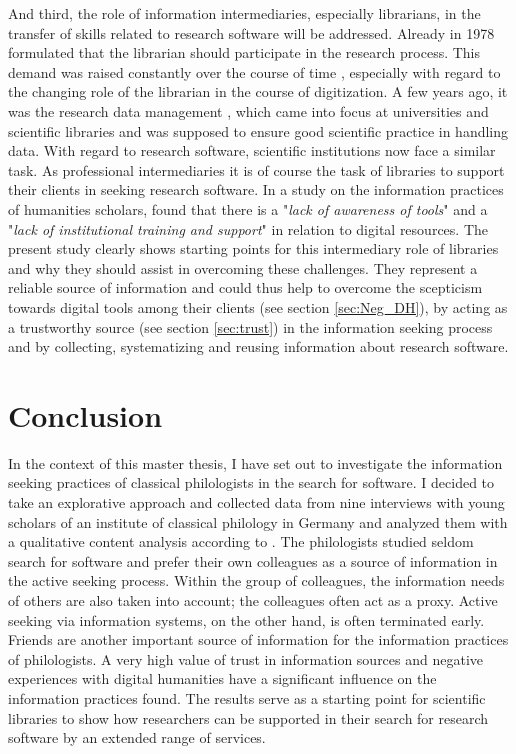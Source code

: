 \documentclass[12pt, a4paper, titlepage, oneside, abstract=true, toc=listof, toc=bibliography, BCOR=1cm]{scrreprt}
\begin{document}
{%
And third, the role of information intermediaries, especially librarians, in the transfer of skills related to research software will be addressed. Already in 1978 \citet{Gunning1978} formulated that the librarian should participate in the research process. This demand was raised constantly over the course of time \citep{Buddenbohm2017, Case2008, Cunningham2010, Koltay2016, MonroeGulick2013, Rothfritz2018, Warwick2008}, especially with regard to the changing role of the librarian in the course of digitization. A few years ago, it was the research data management \citep{Coates2014}, which came into focus at universities and scientific libraries and was supposed to ensure good scientific practice in handling data. With regard to research software, scientific institutions now face a similar task. As professional intermediaries \citep{Edmond2005} it is of course the task of libraries to support their clients in seeking research software. In a study on the information practices of humanities scholars, \citet[p. 73]{Bulger2011} found that there is a "\textit{lack of awareness of tools}" and a "\textit{lack of institutional training and support}" in relation to digital resources. The present study clearly shows starting points for this intermediary role of libraries and why they should assist in overcoming these challenges. They represent a reliable source of information and could thus help to overcome the scepticism towards digital tools among their clients (see section \ref{sec:Neg_DH}), by acting as a trustworthy source (see section \ref{sec:trust}) in the information seeking process and by collecting, systematizing and reusing information about research software.

\chapter{Conclusion}
\label{sec:conclusion}
In the context of this master thesis, I have set out to investigate the information seeking practices of classical philologists in the search for software. I decided to take an explorative approach and collected data from nine interviews with young scholars of an institute of classical philology in Germany and analyzed them with a qualitative content analysis according to \citet{Mayring2014}. The philologists studied seldom search for software and prefer their own colleagues as a source of information in the active seeking process. Within the group of colleagues, the information needs of others are also taken into account; the colleagues often act as a proxy. Active seeking via information systems, on the other hand, is often terminated early. Friends are another important source of information for the information practices of philologists. A very high value of trust in information sources and negative experiences with digital humanities have a significant influence on the information practices found. The results serve as a starting point for scientific libraries to show how researchers can be supported in their search for research software by an extended range of services.

}
\end{document}
